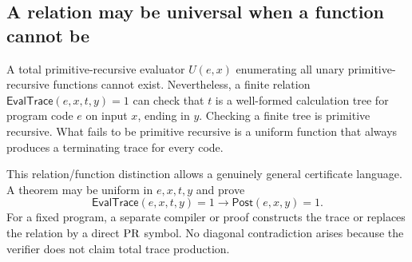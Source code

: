 \subsection{A relation may be universal when a function cannot be}

A total primitive-recursive evaluator \(U(e,x)\) enumerating all unary
primitive-recursive functions cannot exist.  Nevertheless, a finite relation
\(\mathsf{EvalTrace}(e,x,t,y)=1\) can check that \(t\) is a well-formed
calculation tree for program code \(e\) on input \(x\), ending in \(y\).
Checking a finite tree is primitive recursive.  What fails to be primitive
recursive is a uniform function that always produces a terminating trace for
every code.

This relation/function distinction allows a genuinely general certificate
language.  A theorem may be uniform in \(e,x,t,y\) and prove
\[
 \mathsf{EvalTrace}(e,x,t,y)=1\to\mathsf{Post}(e,x,y)=1.
\]
For a fixed program, a separate compiler or proof constructs the trace or
replaces the relation by a direct \(\mathrm{PR}\) symbol.  No diagonal contradiction
arises because the verifier does not claim total trace production.
